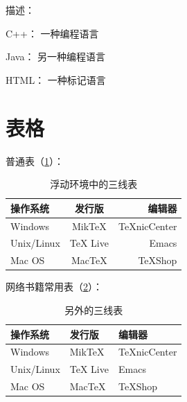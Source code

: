 \documentclass[12pt,a4paper]{article}
\begin{document}
描述：
\begin{description}
\item{C++：}  一种编程语言
\item{Java：}  另一种编程语言
\item{HTML：}  一种标记语言
\end{description}

\section{表格}
普通表（\ref{tab:a}）：
\begin{table}[htbp]
\caption{浮动环境中的三线表}
\label{tab:a}
\centering
\begin{tabular}{l|c|r} %
\hline %
操作系统  &  发行版  &  编辑器  \\
\hline
Windows  &  MikTeX  &  TeXnicCenter  \\
Unix/Linux  &  TeX  Live  &  Emacs  \\
Mac  OS  &  MacTeX  &  TeXShop  \\
\hline
\end{tabular}
\end{table}

网络书籍常用表（\ref{tab:b}）：
\begin{table}[htbp]
\caption{另外的三线表}
\label{tab:b}
\centering
\begin{tabular}{lll}
\toprule
操作系统  &  发行版  &  编辑器  \\
\midrule
Windows  &  MikTeX  &  TeXnicCenter  \\
Unix/Linux  &  TeX  Live  &  Emacs  \\
Mac  OS  &  MacTeX  &  TeXShop  \\
\bottomrule
\end{tabular}
\end{table}

\end{document}

